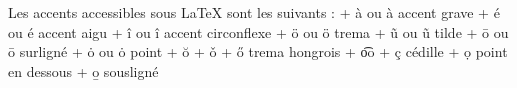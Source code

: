 Les accents accessibles sous LaTeX sont les suivants :
+ \`{a} ou \`a accent grave
+ \'{e} ou \'e accent aigu
+ \^{i} ou \^i accent circonflexe
+ \"{o} ou \"o trema
+ \~{u} ou \~u tilde
+ \={o} ou \=o surligné
+ \.{o} ou \.o point
+ \u{o}
+ \v{o}
+ \H{o} trema hongrois
+ \t{oo}
+ \c{c} cédille
+ \d{o} point en dessous
+ \b{o} sousligné
